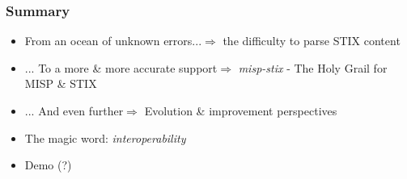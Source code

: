 \begin{frame}
    \frametitle{Summary}
    \begin{itemize}
        \item From an ocean of unknown errors...\linebreak $\Rightarrow$ the difficulty to parse STIX content
        \item ... To a more \& more accurate support\linebreak $\Rightarrow$ \emph{misp-stix} - The Holy Grail for MISP \& STIX
        \item ... And even further\linebreak $\Rightarrow$ Evolution \& improvement perspectives
        \item The magic word: \emph{interoperability}
        \item Demo (?)
    \end{itemize}
\end{frame}

